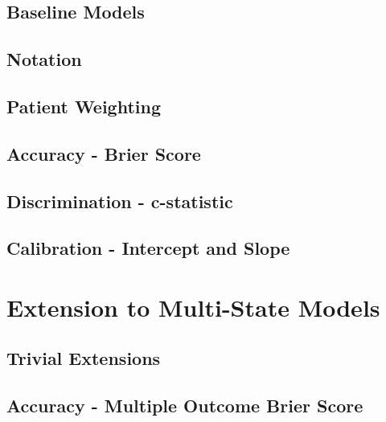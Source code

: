 \documentclass[12pt,PhD,twoside,openright]{muthesis}
\begin{document}
\hypertarget{baseline-models}{%
\subsection{Baseline Models}\label{baseline-models}}

\hypertarget{notation}{%
\subsection{Notation}\label{notation}}

\hypertarget{patient-weighting}{%
\subsection{Patient Weighting}\label{patient-weighting}}

\hypertarget{accuracy---brier-score}{%
\subsection{Accuracy - Brier Score}\label{accuracy---brier-score}}

\hypertarget{discrimination---c-statistic}{%
\subsection{Discrimination - c-statistic}\label{discrimination---c-statistic}}

\hypertarget{calibration---intercept-and-slope}{%
\subsection{Calibration - Intercept and Slope}\label{calibration---intercept-and-slope}}

\hypertarget{extension-to-multi-state-models}{%
\section{Extension to Multi-State Models}\label{extension-to-multi-state-models}}

\hypertarget{trivial-extensions}{%
\subsection{Trivial Extensions}\label{trivial-extensions}}

\hypertarget{accuracy---multiple-outcome-brier-score}{%
\subsection{Accuracy - Multiple Outcome Brier Score}\label{accuracy---multiple-outcome-brier-score}}
\end{document}
